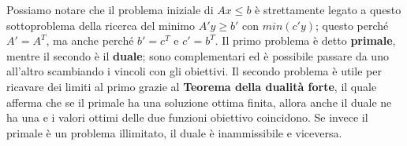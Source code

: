 \noindent Possiamo notare che il problema iniziale di $Ax \leq b$ è strettamente legato a questo sottoproblema della ricerca del minimo $A'y\geq b'$ con
$min(c'y)$; questo perché $A'=A^T$, ma anche perché $b'=c^T$ e $c'=b^T$. Il primo problema è detto \textbf{primale}, mentre il secondo è il
\textbf{duale}; sono complementari ed è possibile passare da uno all'altro scambiando i vincoli con gli obiettivi. Il secondo problema è utile per
ricavare dei limiti al primo grazie al \textbf{Teorema della dualità forte}, il quale afferma che se il primale ha una soluzione ottima finita, allora
anche il duale ne ha una e i valori ottimi delle due funzioni obiettivo coincidono. Se invece il primale è un problema illimitato, il duale è
inammissibile e viceversa.